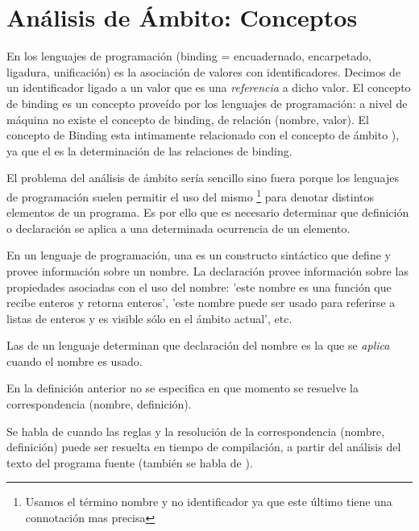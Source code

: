 \label{chapter:simplec}

\section{Análisis de Ámbito: Conceptos}


En los lenguajes de programación  (binding = encuadernado, encarpetado,
ligadura, unificación) es la asociación de valores con identificadores. 
Decimos de un identificador ligado a un valor que es una \emph{referencia} a dicho valor.
El concepto de binding es un concepto proveído por los lenguajes de programación:
a nivel de máquina no existe el concepto de binding, de relación (nombre, valor).
El concepto de Binding esta intimamente relacionado con el concepto de ámbito
), ya que el  es la determinación de las relaciones
de binding.


El problema del análisis de ámbito sería sencillo sino fuera porque 
los lenguajes de programación suelen permitir el uso del mismo
\footnote{Usamos el término nombre y no identificador ya que este
último tiene una connotación mas precisa} 
para denotar distintos elementos de un
programa. Es por ello que es necesario determinar que definición o declaración
se aplica a una determinada ocurrencia de un elemento.

\begin{definition}
En un lenguaje de programación, una  es un constructo sintáctico que define y provee información 
sobre un nombre.
La declaración provee información sobre las propiedades asociadas con el uso del nombre: 'este nombre es una función que recibe enteros y
retorna enteros', 'este nombre puede ser usado para referirse a listas de enteros y es visible sólo en el ámbito actual', etc.
\end{definition}

\begin{definition}
Las  de un lenguaje determinan que declaración
del nombre es la que se \emph{aplica} cuando el nombre es usado.
\end{definition}


En la definición anterior no se especifica en que momento se resuelve
la correspondencia (nombre, definición).

Se habla de  
cuando las reglas y la resolución de la  correspondencia (nombre, definición)
puede ser  resuelta en tiempo de compilación, a partir del análisis 
del texto del programa fuente (también se habla de ).

